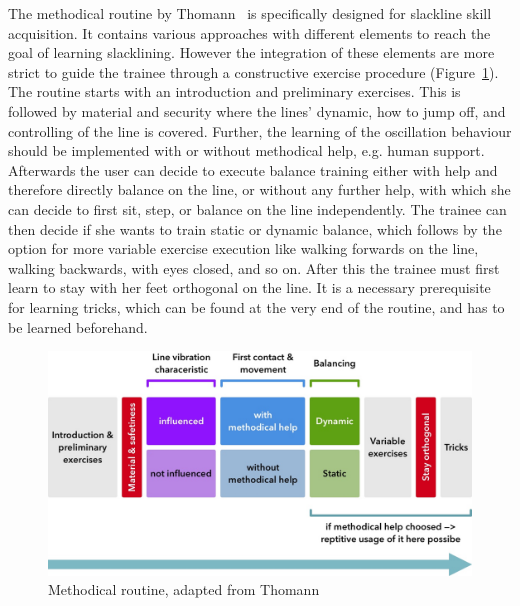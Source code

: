 The methodical routine by Thomann~\cite{Thomann2013-aa} is specifically designed for slackline skill acquisition. It contains various approaches with different elements to reach the goal of learning slacklining. However the integration of these elements are more strict to guide the trainee through a constructive exercise procedure (Figure~\ref{fig:3_3_1_methodicalRoutine}). The routine starts with an introduction and preliminary exercises. This is followed by material and security where the lines' dynamic, how to jump off, and controlling of the line is covered. Further, the learning of the oscillation behaviour should be implemented with or without methodical help, e.g. human support. Afterwards the user can decide to execute balance training either with help and therefore directly balance on the line, or without any further help, with which she can decide to first sit, step, or balance on the line independently.
The trainee can then decide if she wants to train static or dynamic balance, which follows by the option for more variable exercise execution like walking forwards on the line, walking backwards, with eyes closed, and so on. After this the trainee must first learn to stay with her feet orthogonal on the line. It is a necessary prerequisite for learning tricks, which can be found at the very end of the routine, and has to be learned beforehand.
\begin{figure}[htb]
	\centering
	\begin{minipage}[t]{1\linewidth}
		\centering
		\includegraphics[width=0.91\linewidth]{Pictures/3_3_1_methodicalRoutine3}
		\caption{Methodical routine, adapted from Thomann~\cite{Thomann2013-aa}}
		\label{fig:3_3_1_methodicalRoutine}
	\end{minipage}
\end{figure}

